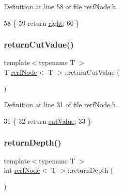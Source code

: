 Definition at line 58 of file rerf\+Node.\+h.


\begin{DoxyCode}
58                                 \{
59             \textcolor{keywordflow}{return} \hyperlink{classrerfNode_ae04521c833fe33f2b1cde19bb3cb615f}{right};  
60         \}
\end{DoxyCode}
\mbox{\label{classrerfNode_a24e784c2f3b958ca6f48be08b2d4a0de}} 
\subsubsection{\texorpdfstring{return\+Cut\+Value()}{returnCutValue()}}
{\footnotesize\ttfamily template$<$typename T $>$ \\
T \hyperlink{classrerfNode}{rerf\+Node}$<$ T $>$\+::return\+Cut\+Value (\begin{DoxyParamCaption}{ }\end{DoxyParamCaption})\hspace{0.3cm}{\ttfamily [inline]}}



Definition at line 31 of file rerf\+Node.\+h.


\begin{DoxyCode}
31                                  \{
32             \textcolor{keywordflow}{return} \hyperlink{classrerfNode_afbb93d044e16d18d7502e5d58fa345bf}{cutValue};
33         \}
\end{DoxyCode}
\mbox{\label{classrerfNode_a6b6d6f3a3e754e680b1a8801ed7d10c8}} 
\subsubsection{\texorpdfstring{return\+Depth()}{returnDepth()}}
{\footnotesize\ttfamily template$<$typename T $>$ \\
int \hyperlink{classrerfNode}{rerf\+Node}$<$ T $>$\+::return\+Depth (\begin{DoxyParamCaption}{ }\end{DoxyParamCaption})\hspace{0.3cm}{\ttfamily [inline]}}



